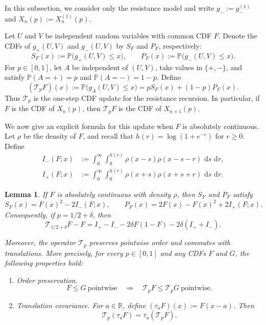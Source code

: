 \documentclass[12pt]{amsart}
\numberwithin{equation}{section}
\theoremstyle{plain}
\newtheorem{lemma}[theorem]{Lemma}
\theoremstyle{definition}
\newcommand{\Pp}{\mathbb P}
\newcommand{\dd}{\,\mathrm d}
\newcommand{\R}{\mathbb R}
\begin{document}
In this subsection, we consider only the resistance model and write
$g_-:=g_-^{(1)}$ and $X_n(p):=X_n^{(1)}(p)$.

Let $U$ and $V$ be independent random variables with common CDF $F$.  Denote
the CDFs of $g_+(U,V)$ and $g_-(U,V)$ by $S_F$ and $P_F$, respectively:
\[
 S_F(x):=\Pp\bigl(g_+(U,V)\le x\bigr),
 \qquad
 P_F(x):=\Pp\bigl(g_-(U,V)\le x\bigr).
\]
For $p\in[0,1]$, let $A$ be independent of $(U,V)$, take values in
$\{+,-\}$, and satisfy $\Pp(A=+)=p$ and $\Pp(A=-)=1-p$.  Define
\begin{equation}
 (\mathcal T_pF)(x):=\Pp\bigl(g_A(U,V)\le x\bigr)
 =pS_F(x)+(1-p)P_F(x).
 \label{eq:CDF-operator-definition}
\end{equation}
Thus $\mathcal T_p$ is the one-step CDF update for the resistance recursion.
In particular, if $F$ is the CDF of $X_n(p)$, then $\mathcal T_pF$ is the
CDF of $X_{n+1}(p)$.

We now give an explicit formula for this update when $F$ is absolutely
continuous.  Let $\rho$ be the density of $F$, and recall that
$h(r)=\log(1+e^{-r})$ for $r\ge0$.
Define \[
\begin{aligned}
I_-(F;x)
 &:=\int_0^\infty\int_0^{h(r)}
   \rho(x-s)\rho(x-s-r)\,\dd s\,\dd r,
 \\
 I_+(F;x)
 &:=\int_0^\infty\int_0^{h(r)}
   \rho(x+s)\rho(x+s+r)\,\dd s\,\dd r.
\end{aligned} \]

\begin{lemma}
\label{lem:exact-cdf}
If $F$ is absolutely continuous with density $\rho$, then $S_F$ and $P_F$
satisfy
\begin{equation}
 S_F(x)=F(x)^2-2I_-(F;x),
 \qquad
 P_F(x)=2F(x)-F(x)^2+2I_+(F;x).
 \label{eq:series-parallel-cdf}
\end{equation}
Consequently, if $p=1/2+\delta$, then
\begin{equation}
 \mathcal T_{1/2+\delta}F-F
 =I_+-I_--2\delta F(1-F)-2\delta(I_++I_-).
 \label{eq:exact-cdf-operator}
\end{equation}
\begin{samepage}
Moreover, the operator $\mathcal T_p$ preserves pointwise order and commutes
with translations.  More precisely, for every $p\in[0,1]$ and any CDFs $F$
and $G$, the following properties hold:
\begin{enumerate}
\item[(i)] \emph{Order preservation.}
\[
 F\le G\ \text{pointwise}
 \quad\Longrightarrow\quad
 \mathcal T_pF\le\mathcal T_pG\ \text{pointwise}.
\]
\item[(ii)] \emph{Translation covariance.}  For $a\in\R$, define
$(\tau_aF)(x):=F(x-a)$.  Then
\[
 \mathcal T_p(\tau_aF)=\tau_a(\mathcal T_pF).
\]
\end{enumerate}
\end{samepage}
\end{lemma}
\end{document}
